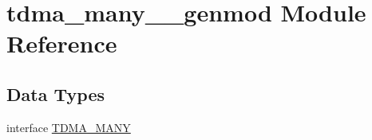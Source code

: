\hypertarget{namespacetdma__many____genmod}{}\section{tdma\+\_\+many\+\_\+\+\_\+genmod Module Reference}
\label{namespacetdma__many____genmod}
\subsection*{Data Types}
\begin{DoxyCompactItemize}
\item 
interface \mbox{\hyperlink{interfacetdma__many____genmod_1_1_t_d_m_a___m_a_n_y}{T\+D\+M\+A\+\_\+\+M\+A\+NY}}
\end{DoxyCompactItemize}
